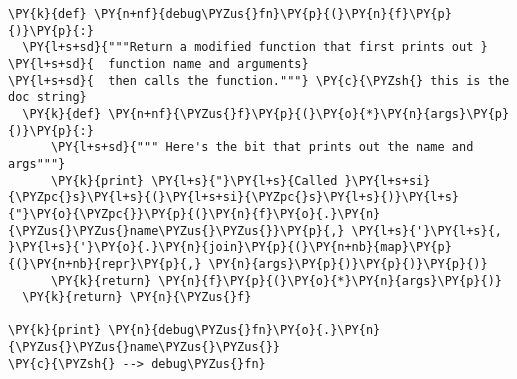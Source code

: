 \begin{Verbatim}[commandchars=\\\{\}]
\PY{k}{def} \PY{n+nf}{debug\PYZus{}fn}\PY{p}{(}\PY{n}{f}\PY{p}{)}\PY{p}{:}
  \PY{l+s+sd}{"""Return a modified function that first prints out }
\PY{l+s+sd}{  function name and arguments}
\PY{l+s+sd}{  then calls the function."""} \PY{c}{\PYZsh{} this is the doc string}
  \PY{k}{def} \PY{n+nf}{\PYZus{}f}\PY{p}{(}\PY{o}{*}\PY{n}{args}\PY{p}{)}\PY{p}{:}
      \PY{l+s+sd}{""" Here's the bit that prints out the name and args"""}
      \PY{k}{print} \PY{l+s}{"}\PY{l+s}{Called }\PY{l+s+si}{\PYZpc{}s}\PY{l+s}{(}\PY{l+s+si}{\PYZpc{}s}\PY{l+s}{)}\PY{l+s}{"}\PY{o}{\PYZpc{}}\PY{p}{(}\PY{n}{f}\PY{o}{.}\PY{n}{\PYZus{}\PYZus{}name\PYZus{}\PYZus{}}\PY{p}{,} \PY{l+s}{'}\PY{l+s}{, }\PY{l+s}{'}\PY{o}{.}\PY{n}{join}\PY{p}{(}\PY{n+nb}{map}\PY{p}{(}\PY{n+nb}{repr}\PY{p}{,} \PY{n}{args}\PY{p}{)}\PY{p}{)}\PY{p}{)}
      \PY{k}{return} \PY{n}{f}\PY{p}{(}\PY{o}{*}\PY{n}{args}\PY{p}{)}
  \PY{k}{return} \PY{n}{\PYZus{}f}

\PY{k}{print} \PY{n}{debug\PYZus{}fn}\PY{o}{.}\PY{n}{\PYZus{}\PYZus{}name\PYZus{}\PYZus{}}
\PY{c}{\PYZsh{} --> debug\PYZus{}fn}
\end{Verbatim}
